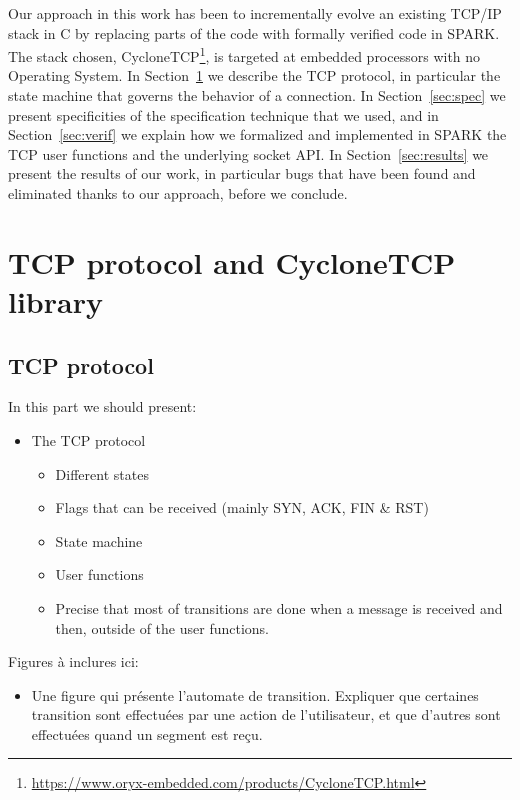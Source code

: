 \documentclass[runningheads]{llncs}
\begin{document}
    Our approach in this work has been to incrementally evolve an existing TCP/IP stack in C by replacing parts of the code with formally verified code in SPARK.
    The stack chosen, CycloneTCP\footnote{\url{https://www.oryx-embedded.com/products/CycloneTCP.html}}, is targeted at embedded processors with no Operating System.
    In Section~\ref{sec:TCP} we describe the TCP protocol, in particular the state machine that governs the behavior of a connection.
    In Section~\ref{sec:spec} we present specificities of the specification technique that we used, and in Section~\ref{sec:verif} we explain how we formalized and implemented in SPARK the TCP user functions and the underlying socket API.
    In Section~\ref{sec:results} we present the results of our work, in particular bugs that have been found and eliminated thanks to our approach, before we conclude.

\section{TCP protocol and CycloneTCP library}
\label{sec:TCP}

\subsection{TCP protocol}


In this part we should present:
\begin{itemize}
    \item The TCP protocol
    \begin{itemize}
        \item Different states
        \item Flags that can be received (mainly SYN, ACK, FIN \& RST)
        \item State machine
        \item User functions
        \item Precise that most of transitions are done when a message is received and then, outside of the user functions.
    \end{itemize}
\end{itemize}


Figures à inclures ici:
\begin{itemize}
    \item Une figure qui présente l'automate de transition. Expliquer que certaines transition sont effectuées par une action de l'utilisateur,
          et que d'autres sont effectuées quand un segment est reçu.
\end{itemize}
\end{document}
